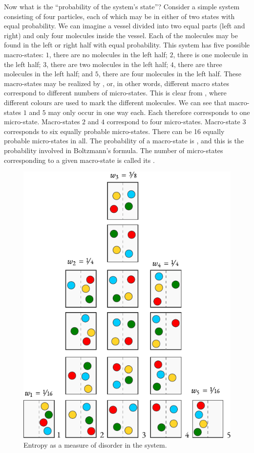  Now what is the ``probability of the system's state''? Consider a simple system consisting of four particles, each of which may be in either of two states with equal probability. We can imagine a vessel divided into two equal parts (left and right) and only four molecules inside the vessel. Each of the molecules may be found in the left or right half with equal probability. This system has five possible macro-states: $\mathit{1}$, there are no molecules in the left half; $\mathit{2}$, there is one molecule in the left half; $\mathit{3}$, there are two molecules in the left half; $\mathit{4}$, there are three molecules in the left half; and $\mathit{5}$, there are four molecules in the left half. These macro-states may be realized by , or, in other words, different macro states correspond to different numbers of micro-states. This is clear from , where different colours are used to mark the different molecules. We can see that macro-states $\mathit{1}$ and $\mathit{5}$ may only occur in one way each. Each therefore corresponds to one micro-state. Macro-states $\mathit{2}$ and $\mathit{4}$ correspond to four micro-states. Macro-state $\mathit{3}$ corresponds to six equally probable micro-states. There can be 16 equally probable micro-states in all. The probability of a macro-state is , and this is the probability involved in Boltzmann's formula. The number of micro-states corresponding to a given macro-state is called its .

\begin{figure}[!ht]
 \centering
 \includegraphics[width=0.7\linewidth]{figures/macro-state-1.pdf}
\caption{Entropy as a measure of disorder in the system.\label{entropy-disorder}}
 \end{figure}
 
